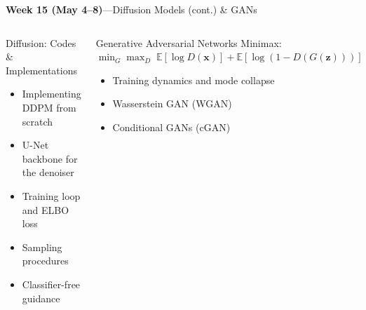 \documentclass[aspectratio=169,11pt]{beamer}
\begin{document}
\begin{frame}{{\color{mlgold}\textbf{Week 15 (May 4--8)}\;---\;Diffusion Models (cont.) \& GANs}}
  \begin{columns}[T]
      \begin{block}{Diffusion: Codes \& Implementations}
        \begin{itemize}\itemsep1pt
          \item Implementing DDPM from scratch
          \item U-Net backbone for the denoiser
          \item Training loop and ELBO loss
          \item Sampling procedures
          \item Classifier-free guidance
        \end{itemize}
      \end{block}
      \begin{block}{Generative Adversarial Networks}
        {\small Minimax: $\min_G\max_D\;
          \mathbb{E}[\log D(\bm{x})]
         +\mathbb{E}[\log(1{-}D(G(\bm{z})))]$}
        \begin{itemize}\itemsep1pt
          \item Training dynamics and mode collapse
          \item Wasserstein GAN (WGAN)
          \item Conditional GANs (cGAN)
        \end{itemize}
      \end{block}
  \end{columns}
\end{frame}
\end{document}
